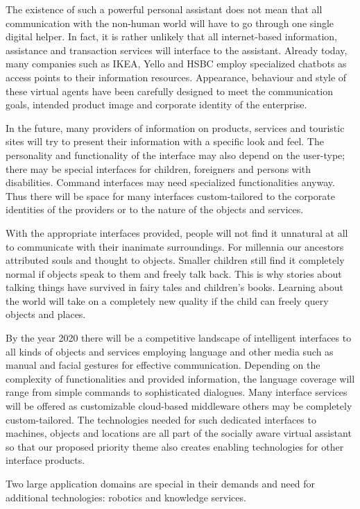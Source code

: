 \begin{multicols}{2}
The existence of such a powerful personal assistant does not mean that all communication with the non-human world will have to go through one single digital helper. In fact, it is rather unlikely that all internet-based information, assistance and transaction services will interface to the assistant. Already today, many companies such as IKEA, Yello and HSBC employ specialized chatbots as access points to their information resources. Appearance, behaviour and style of these virtual agents have been carefully designed to meet the communication goals, intended product image and corporate identity of the enterprise.
 
In the future, many providers of information on products, services and touristic sites will try to present their information with a specific look and feel. The personality and functionality of the interface may also depend on the user-type; there may be special interfaces for children, foreigners and persons with disabilities. Command interfaces may need specialized functionalities anyway. Thus there will be space for many interfaces custom-tailored to the corporate identities of the providers or to the nature of the objects and services.
 
With the appropriate interfaces provided, people will not find it unnatural at all to communicate with their inanimate surroundings. For millennia our ancestors attributed souls and thought to objects. Smaller children still find it completely normal if objects speak to them and freely talk back. This is why stories about talking things have survived in fairy tales and children’s books. Learning about the world will take on a completely new quality if the child can freely query objects and places.
 
By the year 2020 there will be a competitive landscape of intelligent interfaces to all kinds of objects and services employing language and other media such as manual and facial gestures for effective communication. Depending on the complexity of functionalities and provided information, the language coverage will range from simple commands to sophisticated dialogues. Many interface services will be offered as customizable cloud-based middleware others may be completely custom-tailored. The technologies needed for such dedicated interfaces to machines, objects and locations are all part of the socially aware virtual assistant so that our proposed priority theme also creates enabling technologies for other interface products.
 
Two large application domains are special in their demands and need for additional technologies: robotics and knowledge services.
 

\end{multicols}
